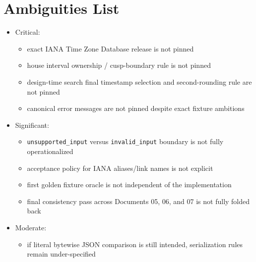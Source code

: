 \documentclass[11pt]{article}
\begin{document}
\section{Ambiguities List}
\label{sec:org9b531c1}
\begin{itemize}
\item Critical:
\begin{itemize}
\item exact IANA Time Zone Database release is not pinned
\item house interval ownership / cusp-boundary rule is not pinned
\item design-time search final timestamp selection and second-rounding rule are not pinned
\item canonical error messages are not pinned despite exact fixture ambitions
\end{itemize}
\item Significant:
\begin{itemize}
\item \texttt{unsupported\_input} versus \texttt{invalid\_input} boundary is not fully operationalized
\item acceptance policy for IANA aliases/link names is not explicit
\item first golden fixture oracle is not independent of the implementation
\item final consistency pass across Documents 05, 06, and 07 is not fully folded back
\end{itemize}
\item Moderate:
\begin{itemize}
\item if literal bytewise JSON comparison is still intended, serialization rules remain under-specified
\end{itemize}
\end{itemize}
\end{document}
